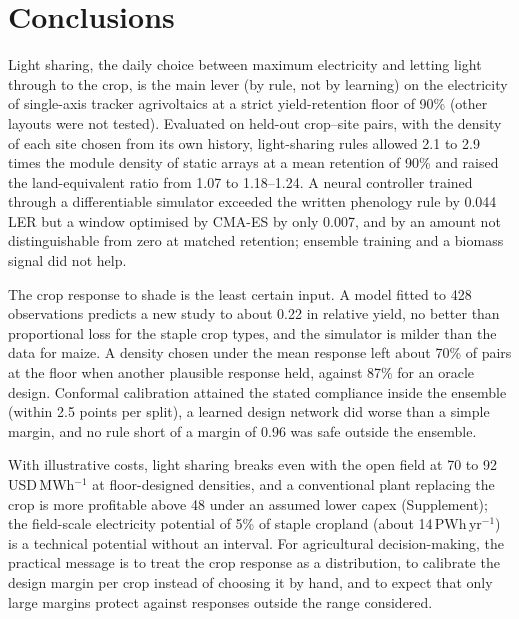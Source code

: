 \section{Conclusions}\label{sec:conclusions}
Light sharing, the daily choice between maximum electricity and letting light through to the crop, is the main lever (by rule, not by learning) on the electricity of single-axis tracker agrivoltaics at a strict yield-retention floor of 90\% (other layouts were not tested). Evaluated on held-out crop--site pairs, with the density of each site chosen from its own history, light-sharing rules allowed 2.1 to 2.9 times the module density of static arrays at a mean retention of 90\% and raised the land-equivalent ratio from 1.07 to 1.18--1.24. A neural controller trained through a differentiable simulator exceeded the written phenology rule by 0.044 LER but a window optimised by CMA-ES by only 0.007, and by an amount not distinguishable from zero at matched retention; ensemble training and a biomass signal did not help.

The crop response to shade is the least certain input. A model fitted to 428 observations predicts a new study to about 0.22 in relative yield, no better than proportional loss for the staple crop types, and the simulator is milder than the data for maize. A density chosen under the mean response left about 70\% of pairs at the floor when another plausible response held, against 87\% for an oracle design. Conformal calibration attained the stated compliance inside the ensemble (within 2.5 points per split), a learned design network did worse than a simple margin, and no rule short of a margin of 0.96 was safe outside the ensemble.

With illustrative costs, light sharing breaks even with the open field at 70 to 92\,USD\,MWh$^{-1}$ at floor-designed densities, and a conventional plant replacing the crop is more profitable above 48 under an assumed lower capex (Supplement); the field-scale electricity potential of 5\% of staple cropland (about 14\,PWh\,yr$^{-1}$) is a technical potential without an interval. For agricultural decision-making, the practical message is to treat the crop response as a distribution, to calibrate the design margin per crop instead of choosing it by hand, and to expect that only large margins protect against responses outside the range considered.
